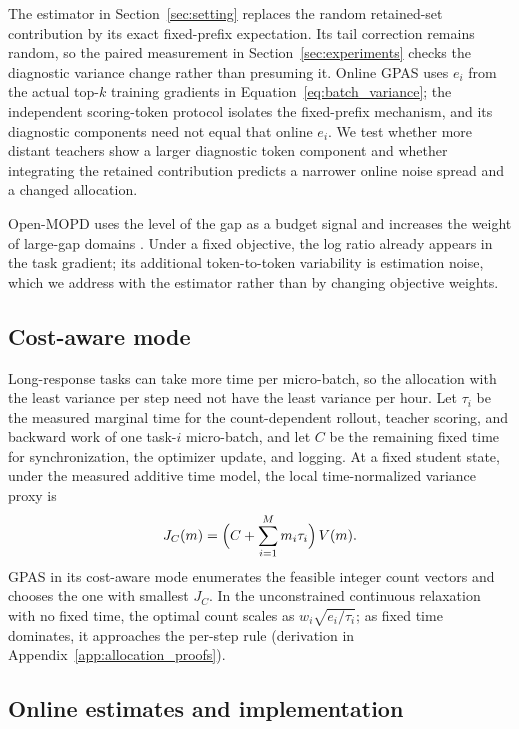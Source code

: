 The estimator in Section~\ref{sec:setting} replaces the random retained-set
contribution by its exact fixed-prefix expectation. Its tail correction remains
random, so the paired measurement in Section~\ref{sec:experiments} checks the
diagnostic variance change rather than presuming it. Online GPAS uses $e_i$
from the actual top-$k$ training gradients in Equation~\ref{eq:batch_variance};
the independent scoring-token protocol isolates the fixed-prefix mechanism,
and its diagnostic components need not equal that online $e_i$. We test whether
more distant teachers show a larger diagnostic token component and whether
integrating the retained contribution predicts a narrower online noise spread
and a changed allocation.

Open-MOPD uses the level of the gap as a budget signal and increases the weight
of large-gap domains \citep{gao2026openmopddiagnosingfixingcapability}. Under a
fixed objective, the log ratio already appears in the task gradient; its
additional token-to-token variability is estimation noise, which we address
with the estimator rather than by changing objective weights.

\subsection{Cost-aware mode}

Long-response tasks can take more time per micro-batch, so the allocation with
the least variance per step need not have the least variance per hour. Let
$\tau_i$ be the measured marginal time for the count-dependent rollout,
teacher scoring, and backward work of one task-$i$ micro-batch, and let $C$ be
the remaining fixed time for synchronization, the optimizer update, and
logging. At a fixed student state, under the measured additive time model, the
local time-normalized variance proxy is
\begin{equation}
    J_C(m)=\Bigl(C+\sum_{i=1}^M m_i\tau_i\Bigr)\,V(m).
    \label{eq:batch_cost_objective}
\end{equation}
GPAS in its cost-aware mode enumerates the feasible integer count vectors and
chooses the one with smallest $J_C$. In the unconstrained continuous relaxation
with no fixed time, the optimal count scales as
$w_i\sqrt{e_i/\tau_i}$; as fixed time dominates, it approaches the per-step
rule (derivation in Appendix~\ref{app:allocation_proofs}).

\subsection{Online estimates and implementation}

